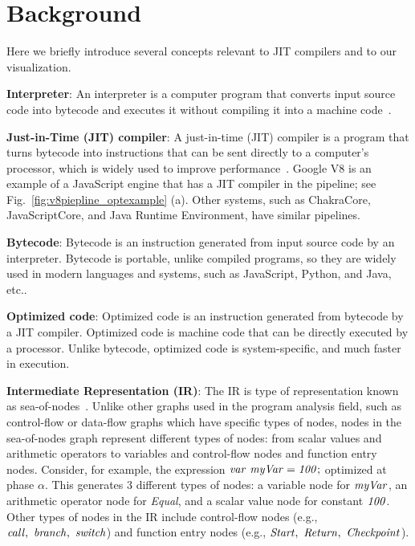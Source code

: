 \documentclass[runningheads]{llncs}
\begin{document}
\section{Background}\label{sec:background}

Here we briefly introduce several concepts relevant to JIT compilers and to our visualization.

\textbf{Interpreter}: An interpreter is a computer program that converts input source code into bytecode and executes it without compiling it into a machine code~\cite{DBLP:conf/hpcn/GreggEK01}.

\textbf{Just-in-Time (JIT) compiler}: A just-in-time (JIT) compiler is a program that turns bytecode into instructions that can be sent directly to a computer's processor, which is widely used to improve performance~\cite{DBLP:journals/concurrency/IshizakiKYTOSOKN00}. Google V8 is an example of a JavaScript engine that has a JIT compiler in the pipeline; see Fig.~\ref{fig:v8piepline_optexample} (a). Other systems, such as ChakraCore, JavaScriptCore, and Java Runtime Environment, have similar pipelines.

\textbf{Bytecode}: Bytecode is an instruction generated from input source code by an interpreter. Bytecode is portable, unlike compiled programs, so they are widely used in modern languages and systems, such as JavaScript, Python, and Java, etc.\cite{DBLP:conf/jit/Dahm99}.

\textbf{Optimized code}: Optimized code is an instruction generated from bytecode by a JIT compiler. Optimized code is machine code that can be directly executed by a processor. Unlike bytecode, optimized code is system-specific, and much faster in execution.

\textbf{Intermediate Representation (IR)}: The IR is type of representation known as sea-of-nodes~\cite{10.1145/3178372.3179503,meurer2016v8,Sevcik2016keyinstructions}. Unlike other graphs used in the program analysis field, such as control-flow or data-flow graphs which have specific types of nodes, nodes in the sea-of-nodes graph represent different types of nodes: from scalar values and arithmetic operators to variables and control-flow nodes and function entry nodes. Consider, for example, the  expression $\it var\ myVar = 100;$ optimized at phase $\alpha$. This generates 3 different types of nodes: a variable node for $\it myVar$, an arithmetic operator node for {\it Equal}, and a scalar value node for  constant $\it 100$. Other types of nodes in the IR include control-flow nodes (e.g., $\it call,\ branch,\ switch$) and function entry nodes (e.g., $\it Start,\ Return,\ Checkpoint$).
\end{document}
